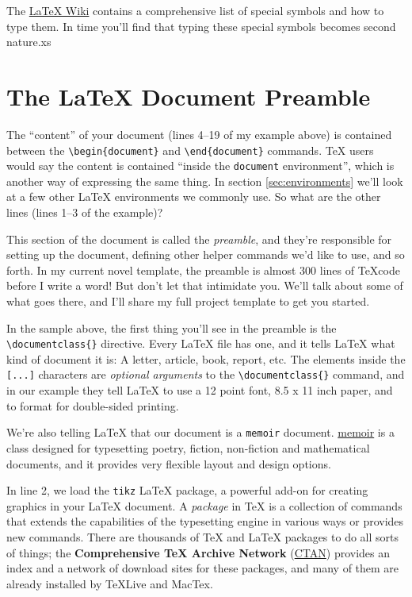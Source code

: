 The \href{https://latex.wikia.org/wiki/List_of_LaTeX_symbols}{\LaTeX{} Wiki}
contains a comprehensive list of special symbols and how to type them. In time
you'll find that typing these special symbols becomes second nature.xs

\section{The \LaTeX{} Document Preamble} \label{sec:preamble}

The ``content'' of your document (lines 4--19 of my example above) is
contained between the \texttt{\textbackslash{}begin\{document\}} and
\texttt{\textbackslash{}end\{document\}} commands. \TeX{} users would say the
content is contained ``inside the \texttt{document} environment'', which is
another way of expressing the same thing. In section \ref{sec:environments}
we'll look at a few other \LaTeX{} environments we commonly use. So what are the
other lines (lines 1--3 of the example)?

This section of the document is called the \emph{preamble}, and they're
responsible for setting up the document, defining other helper commands we'd
like to use, and so forth. In my current novel template, the preamble is
almost 300 lines of \TeX code before I write a word! But don't let that
intimidate you. We'll talk about some of what goes there, and I'll share my
full project template to get you started.

In the sample above, the first thing you'll see in the preamble is the
\texttt{\textbackslash{}documentclass\{\}} directive. Every \LaTeX{} file has
one, and it tells \LaTeX{} what kind of document it is: A letter, article, book,
report, etc. The elements inside the \texttt{[...]} characters are
\emph{optional arguments} to the \texttt{\textbackslash{}documentclass\{\}}
command, and in our example they tell \LaTeX{} to use a 12 point font, 8.5 x 11
inch paper, and to format for double-sided printing.

We're also telling \LaTeX{} that our document is a \texttt{memoir} document.
\href{https://www.ctan.org/tex-archive/macros/latex/contrib/memoir}{memoir} is
a class designed for typesetting poetry, fiction, non-fiction and mathematical
documents, and it provides very flexible layout and design options.

In line 2, we load the \texttt{tikz} \LaTeX{} package, a powerful add-on for
creating graphics in your \LaTeX{} document. A \emph{package} in \TeX{} is a
collection of commands that extends the capabilities of the typesetting engine
in various ways or provides new commands. There are thousands of \TeX{} and
\LaTeX{} packages to do all sorts of things; the \textbf{Comprehensive \TeX
Archive Network} (\href{https://www.ctan.org}{CTAN}) provides an index
and a network of download sites for these packages, and many of them are
already installed by TeXLive and MacTex.

